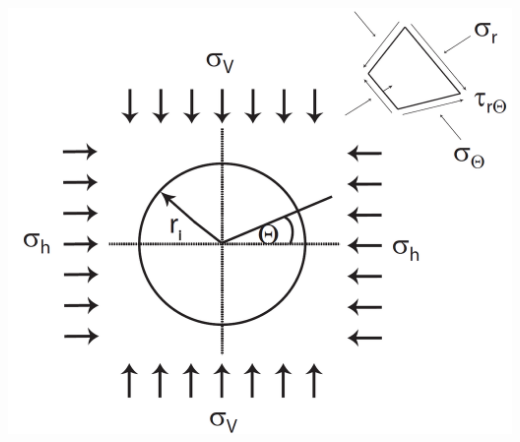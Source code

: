 \documentclass[fleqn,twoside]{article}
\begin{document}
\begin{minipage}{0.27\textwidth}
    \includegraphics[width=1\textwidth]{Grafiken/gelochte Scheibe.png}
\end{minipage}
\end{document}
